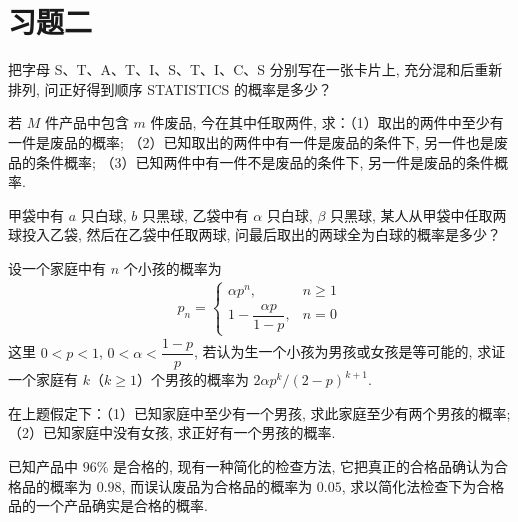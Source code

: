 \documentclass[../../main.tex]{subfiles}
\begin{document}
\section*{习题二}\label{section:ch02-习题二}


\begin{exercise}\label{exercise:ch02-01}
把字母 S、T、A、T、I、S、T、I、C、S 分别写在一张卡片上, 充分混和后重新排列, 问正好得到顺序 STATISTICS 的概率是多少？
\end{exercise}

\begin{exercise}\label{exercise:ch02-02}
若 $M$ 件产品中包含 $m$ 件废品, 今在其中任取两件, 求：（1）取出的两件中至少有一件是废品的概率; （2）已知取出的两件中有一件是废品的条件下, 另一件也是废品的条件概率; （3）已知两件中有一件不是废品的条件下, 另一件是废品的条件概率.
\end{exercise}

\begin{exercise}\label{exercise:ch02-03}
甲袋中有 $a$ 只白球, $b$ 只黑球, 乙袋中有 $\alpha$ 只白球, $\beta$ 只黑球, 某人从甲袋中任取两球投入乙袋, 然后在乙袋中任取两球, 问最后取出的两球全为白球的概率是多少？
\end{exercise}

\begin{exercise}\label{exercise:ch02-04}
设一个家庭中有 $n$ 个小孩的概率为
\begin{align*}
p_n=
\begin{cases}
\alpha p^n, & n\geqslant 1\\
1-\dfrac{\alpha p}{1-p}, & n=0
\end{cases}
\end{align*}
这里 $0<p<1$, $0<\alpha<\dfrac{1-p}{p}$, 若认为生一个小孩为男孩或女孩是等可能的, 求证一个家庭有 $k$（$k\geqslant 1$）个男孩的概率为 $2\alpha p^k/(2-p)^{k+1}$.
\end{exercise}

\begin{exercise}\label{exercise:ch02-05}
在上题假定下：（1）已知家庭中至少有一个男孩, 求此家庭至少有两个男孩的概率; （2）已知家庭中没有女孩, 求正好有一个男孩的概率.
\end{exercise}

\begin{exercise}\label{exercise:ch02-06}
已知产品中 $96\%$ 是合格的, 现有一种简化的检查方法, 它把真正的合格品确认为合格品的概率为 $0.98$, 而误认废品为合格品的概率为 $0.05$, 求以简化法检查下为合格品的一个产品确实是合格的概率.
\end{exercise}
\end{document}
